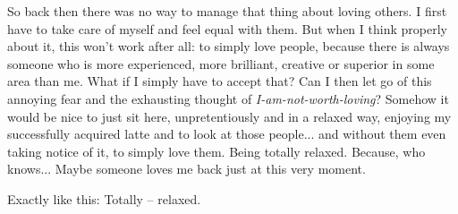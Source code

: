 So back then there was no way to manage that thing about loving others. I first have to take care of myself and feel equal with them. But when I think properly about it, this won't work after all: to simply love people, because there is always someone who is more experienced, more brilliant, creative or superior in some area than me. What if I simply have to accept that? Can I then let go of this annoying fear and the exhausting thought of \textit{I-am-not-worth-loving}? Somehow it would be nice to just sit here, unpretentiously and in a relaxed way, enjoying my successfully acquired latte and to look at those people... and without them even taking notice of it, to simply love them. Being totally relaxed. Because, who knows... Maybe someone loves me back just at this very moment.

Exactly like this: Totally -- relaxed.
